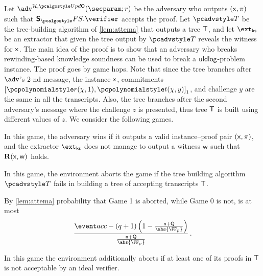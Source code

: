 

Let $\adv^{\ro, \initU}(\secparam; r)$ be the adversary who outputs $(\mathsf{x}, \pi)$ such that $\sonicprotfs.\verifier$ accepts the proof. Let $\tdv$ be the tree-building algorithm of \cref{lem:attema} that outputs a tree $\mathsf{T}$, and let $\extcss$ be an extractor that given the tree output by $\tdv$ reveals the witness for $\mathsf{x}$. The main idea of the proof is to show that an adversary who breaks rewinding-based knowledge soundness can be used to break a $\mathsf{uldlog}$-problem instance. The proof goes by game hops. Note that since the tree branches after $\adv$'s $2$-nd message, the instance $\mathsf{x}$, commitments $\gone{\p{r} (\chi, 1), \p{t} (\chi, y)}$, and challenge $y$ are the same in all the transcripts. Also, the tree branches after the second adversary's message where the challenge $z$ is presented, thus tree $\mathsf{T}$ is built using different values of $z$.	We consider the following games.

  In this game, the adversary wins if it outputs a valid instance--proof pair $(\mathsf{x}, \pi)$, and the extractor $\extcss$ does not manage to output a witness $\mathsf{w}$ such that $\mathbf{R} (\mathsf{x}, \mathsf{w})$ holds.

  In this game, the environment aborts the game if the tree building algorithm $\tdv$ fails in building a tree of accepting transcripts $\mathsf{T}$. 

  By \cref{lem:attema} probability that Game 1 is aborted, while Game 0 is not, is at most 
  \[
    \frac{\accProb - (q + 1) \left( 1 - \frac{\multconstr + \linconstr}{\abs{\FF_p}} \right)} {\frac{\multconstr + \linconstr }{\abs{\FF_p}}} \,.
  \]

  In this game the environment additionally aborts if at least one of its proofs in $\mathsf{T}$ is not acceptable by an ideal verifier.

